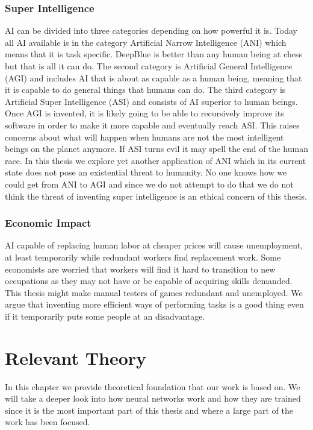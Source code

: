 \documentclass{kththesis}
\begin{document}
\subsection{Super Intelligence}
AI can be  divided into three categories  depending on how powerful it is. Today all AI available is in the category Artificial  Narrow Intelligence (ANI) which means that it is task specific. DeepBlue is better than any human being at chess but that is all it can do. The second category is Artificial General Intelligence (AGI) and  includes AI that is about as capable as a human being, meaning that it is capable to do general things that humans can do. The third category is  Artificial Super Intelligence (ASI) and  consists of AI superior to human beings. Once AGI is invented, it is likely going to be able to recursively improve its software in order to make it more capable and eventually reach ASI. This raises concerns about what will happen when humans are not the most intelligent beings on the planet anymore. If ASI turns evil it may spell the end of the human race.  In this thesis we explore yet another application of ANI which in its current state does not pose an existential threat to humanity. No one knows how  we could get from ANI to AGI and since we do not attempt to  do that we do not think the threat of inventing super intelligence is  an ethical concern of this thesis.

\subsection{Economic Impact}
AI capable of replacing human labor  at cheaper prices will cause unemployment, at least temporarily while redundant workers  find replacement work. Some economists are worried that  workers will find it hard to transition to new occupations as they may not have or be capable of acquiring skills demanded.  This thesis might make  manual testers of games redundant and unemployed. We argue that inventing more efficient ways of performing tasks is a good thing even if it temporarily puts some people at an disadvantage. 

\chapter{Relevant Theory}
In this chapter we provide  theoretical foundation that our work is based on. We will take a deeper look into how neural networks work and how they are trained since it is the most important part of this thesis and where a large part of the work has been focused. 
\end{document}
